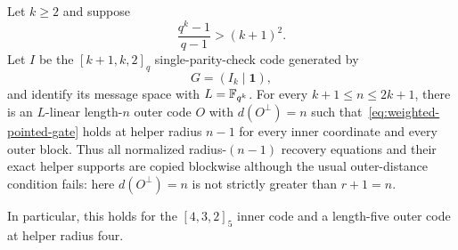 \begin{proposition}
\label{prop:strict-weighted-transfer}
%
%
Let $k\geq2$ and suppose
\begin{equation}
 \frac{q^k-1}{q-1}>(k+1)^2.
 \label{eq:singer-disjointness}
\end{equation}
Let $I$ be the $[k+1,k,2]_q$ single-parity-check code generated by
\[
 G=(I_k\mid\mathbf1),
\]
and identify its message space with $L=\mathbb F_{q^k}$.  For every
$k+1\leq n\leq2k+1$, there is an $L$-linear length-$n$ outer code $O$ with
$d(O^\perp)=n$ such that~\eqref{eq:weighted-pointed-gate} holds at helper
radius $n-1$ for every inner coordinate and every outer block.  Thus all
normalized radius-$(n-1)$ recovery equations and their exact helper supports
are copied blockwise although the usual outer-distance condition fails: here
$d(O^\perp)=n$ is not strictly greater than $r+1=n$.

In particular, this holds for the $[4,3,2]_5$ inner code and a length-five
outer code at helper radius four.
\end{proposition}

